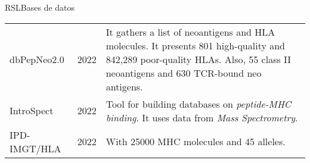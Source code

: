 \documentclass[10pt]{beamer}
\newcommand{\1}{
	\setbeamertemplate{background}{
		\texttt{[image: img/1]}
		\tikz[overlay] \fill[fill opacity=0.75,fill=white] (0,0) rectangle (-\paperwidth,\paperheight);
	}
}
\begin{document}
\begin{frame}{RSL}{Bases de datos}
\begin{table}[]
{\begin{tabular}{p{1.7cm}p{1.2cm}p{6.5cm}}
				\\
				dbPepNeo2.0    & 2022 \cite{lu2022dbpepneo2}                                          &
				It gathers a list of neoantigens and HLA molecules. It presents 801 high-quality and 842,289 poor-quality HLAs. Also, 55 class II neoantigens and 630 TCR-bound neo antigens.
				\\
				IntroSpect      & 2022 \cite{zhang2022introspect}                                      & Tool for building databases on \textit{peptide-MHC binding}. It uses data from \textit{Mass Spectrometry}.   \\
				
				IPD-IMGT/HLA & 2022 \cite{robinson2020ipd}    &    With 25000 MHC molecules and 45 alleles.                                                                
			\end{tabular}
		}
	\end{table}	
\end{frame}
\end{document}

